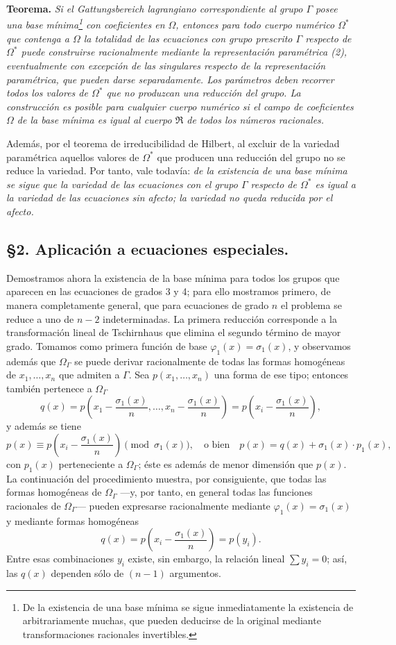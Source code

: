 \smallskip
\noindent\textbf{Teorema.} \emph{Si el \emph{Gattungsbereich} lagrangiano correspondiente al grupo $\Gamma$ posee una base mínima\footnote{De la existencia de una base mínima se sigue inmediatamente la existencia de arbitrariamente muchas, que pueden deducirse de la original mediante transformaciones racionales invertibles.} con coeficientes en $\Omega$, entonces para todo cuerpo numérico $\Omega^*$ que contenga a $\Omega$ la totalidad de las ecuaciones con grupo prescrito $\Gamma$ respecto de $\Omega^*$ puede construirse racionalmente mediante la representación paramétrica (2), eventualmente con excepción de las singulares respecto de la representación paramétrica, que pueden darse separadamente. Los parámetros deben recorrer todos los valores de $\Omega^*$ que no produzcan una reducción del grupo. La construcción es posible para cualquier cuerpo numérico si el campo de coeficientes $\Omega$ de la base mínima es igual al cuerpo $\mathfrak R$ de todos los números racionales.}

Además, por el teorema de irreducibilidad de Hilbert, al excluir de la variedad paramétrica aquellos valores de $\Omega^*$ que producen una reducción del grupo no se reduce la variedad. Por tanto, vale todavía: \emph{de la existencia de una base mínima se sigue que la variedad de las ecuaciones con el grupo $\Gamma$ respecto de $\Omega^*$ es igual a la variedad de las ecuaciones sin afecto; la variedad no queda reducida por el afecto.}

\subsection*{\S 2. Aplicación a ecuaciones especiales.}

Demostramos ahora la existencia de la base mínima para todos los grupos que aparecen en las ecuaciones de grados 3 y 4; para ello mostramos primero, de manera completamente general, que para ecuaciones de grado $n$ el problema se reduce a uno de $n-2$ indeterminadas. La primera reducción corresponde a la transformación lineal de Tschirnhaus que elimina el segundo término de mayor grado. Tomamos como primera función de base $\varphi_1(x)=\sigma_1(x)$, y observamos además que $\Omega_\Gamma$ se puede derivar racionalmente de todas las formas homogéneas de $x_1,
\ldots,x_n$ que admiten a $\Gamma$. Sea $p(x_1,
\ldots,x_n)$ una forma de ese tipo; entonces también pertenece a $\Omega_\Gamma$
\[
q(x)=p\left(x_1-\frac{\sigma_1(x)}{n},\ldots,x_n-\frac{\sigma_1(x)}{n}\right)=p\left(x_i-\frac{\sigma_1(x)}{n}\right),
\]
y además se tiene
\[
p(x)\equiv p\left(x_i-\frac{\sigma_1(x)}{n}\right)\pmod{\sigma_1(x)},
\quad\text{o bien}\quad
p(x)=q(x)+\sigma_1(x)\cdot p_1(x),
\]
con $p_1(x)$ perteneciente a $\Omega_\Gamma$; éste es además de menor dimensión que $p(x)$. La continuación del procedimiento muestra, por consiguiente, que todas las formas homogéneas de $\Omega_\Gamma$ ---y, por tanto, en general todas las funciones racionales de $\Omega_\Gamma$--- pueden expresarse racionalmente mediante $\varphi_1(x)=\sigma_1(x)$ y mediante formas homogéneas
\[
q(x)=p\left(x_i-\frac{\sigma_1(x)}{n}\right)=p(y_i).
\]
Entre esas combinaciones $y_i$ existe, sin embargo, la relación lineal $\sum y_i=0$; así, las $q(x)$ dependen sólo de $(n-1)$ argumentos.

